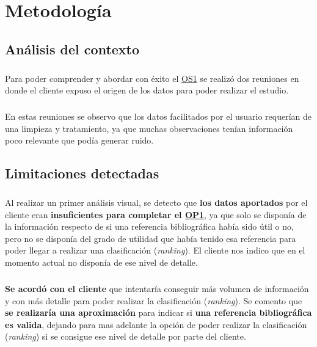 \chapter{Metodología}
\label{chapter:metodologia}


\section{Análisis del contexto}

\paragraph{}
Para poder comprender y abordar con éxito el \hyperref[os:OS1]{OS1} se realizó dos reuniones en donde el cliente expuso el origen de los datos para poder realizar el estudio.

\paragraph{}
En estas reuniones se observo que los datos facilitados por el usuario requerían de una limpieza y tratamiento, ya que muchas observaciones tenían información poco relevante que podía generar ruido\cite{ref:noisy_data}.

\section{Limitaciones detectadas}
\label{section:limit}

\paragraph{}
Al realizar un primer análisis visual, se detecto que \textbf{los datos aportados} por el cliente eran \textbf{insuficientes para completar el \hyperref[op:OP1]{OP1}}, ya que solo se disponía de la información respecto de si una referencia bibliográfica había sido útil o no, pero no se disponía del grado de utilidad que había tenido esa referencia para poder llegar a realizar una clasificación (\textit{ranking}). El cliente nos indico que en el momento actual no disponía de ese nivel de detalle.

\paragraph{}
\textbf{Se acordó con el cliente} que intentaría conseguir más volumen de información y con más detalle para poder realizar la clasificación (\textit{ranking}). Se comento que \textbf{se realizaría una aproximación} para indicar si \textbf{una referencia bibliográfica es valida}, dejando para mas adelante la opción de poder realizar la clasificación (\textit{ranking}) si se consigue ese nivel de detalle por parte del cliente.

